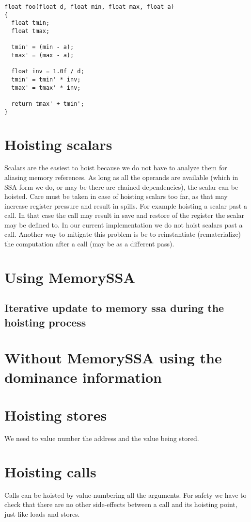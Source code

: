 \documentclass{sig-alternate}
\begin{document}
\begin{verbatim}
float foo(float d, float min, float max, float a)
{
  float tmin;
  float tmax;

  tmin' = (min - a);
  tmax' = (max - a);

  float inv = 1.0f / d;
  tmin' = tmin' * inv;
  tmax' = tmax' * inv;

  return tmax' + tmin';
}
\end{verbatim}

\section{Hoisting scalars}
Scalars are the easiest to hoist because we do not have to analyze
them for aliasing memory references. As long as all the operands are
available (which in SSA form we do, or may be there are chained
dependencies), the scalar can be hoisted. Care must be taken in case
of hoisting scalars too far, as that may increase register pressure
and result in spills. For example hoisting a scalar past a call. In
that case the call may result in save and restore of the register the
scalar may be defined to. In our current implementation we do not
hoist scalars past a call. Another way to mitigate this problem is be
to reinstantiate (rematerialize) the computation after a call (may be
as a different pass).



\section{Using MemorySSA}
\subsection{Iterative update to memory ssa during the hoisting process}

\section{Without MemorySSA using the dominance information}

\section{Hoisting stores}
We need to value number the address and the value being stored.

\section{Hoisting calls}
Calls can be hoisted by value-numbering all the arguments. For safety
we have to check that there are no other side-effects between a call and
its hoisting point, just like loads and stores.
\end{document}
